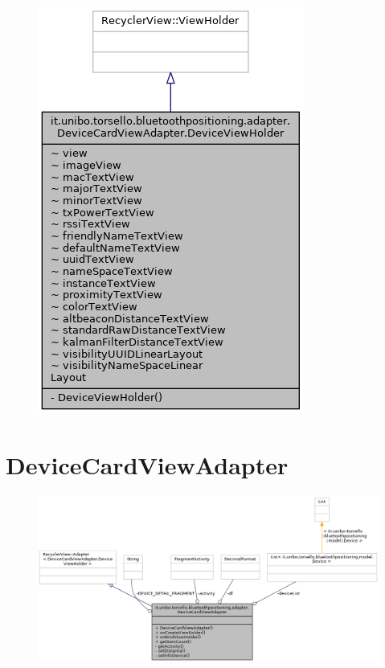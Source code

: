 \begin{figure}[ph]
	\centering
	\includegraphics[width=0.5\linewidth]{img/uml/class/classit_1_1unibo_1_1torsello_1_1bluetoothpositioning_1_1adapter_1_1DeviceCardViewAdapter_1_1DeviceViewHolder__inherit__graph.png}
	\caption{}
\end{figure}

\newpage
\section{DeviceCardViewAdapter}
\begin{figure}[ph]
	\centering
	\includegraphics[width=1.2\linewidth]{img/uml/class/classit_1_1unibo_1_1torsello_1_1bluetoothpositioning_1_1adapter_1_1DeviceCardViewAdapter__coll__graph.png}
	\caption{}
\end{figure}

